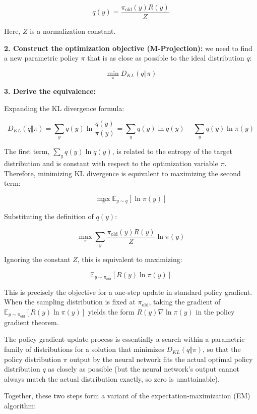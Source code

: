 \[
q(y)=\frac{\pi_{\mathrm{old}}(y)R(y)}{Z}
\]

Here, \(Z\) is a normalization constant.

\textbf{2. Construct the optimization objective (M-Projection):} we need to find a new parametric policy \(\pi\) that is as close as possible to the ideal distribution \(q\):

\[
\min_\pi D_{KL}(q\Vert \pi)
\]

\textbf{3. Derive the equivalence:}

Expanding the KL divergence formula:

\[
D_{KL}(q\Vert \pi)
= \sum_y q(y)\ln\frac{q(y)}{\pi(y)}
= \sum_y q(y)\ln q(y)-\sum_y q(y)\ln\pi(y)
\]

The first term, \(\sum_y q(y)\ln q(y)\), is related to the entropy of the target distribution and is constant with respect to the optimization variable \(\pi\). Therefore, minimizing KL divergence is equivalent to maximizing the second term:

\[
\max_\pi \mathbb{E}_{y\sim q}[\ln \pi(y)]
\]

Substituting the definition of \(q(y)\):

\[
\max_\pi \sum_y \frac{\pi_{\mathrm{old}}(y)R(y)}{Z}\ln\pi(y)
\]

Ignoring the constant \(Z\), this is equivalent to maximizing:

\[
\mathbb{E}_{y\sim \pi_{\mathrm{old}}}[R(y)\ln\pi(y)]
\]

This is precisely the objective for a one-step update in standard policy gradient. When the sampling distribution is fixed at \(\pi_{\mathrm{old}}\), taking the gradient of \(\mathbb{E}_{y\sim\pi_{\mathrm{old}}}[R(y)\ln\pi(y)]\) yields the form \(R(y)\nabla\ln\pi(y)\) in the policy gradient theorem.

The policy gradient update process is essentially a search within a parametric family of distributions for a solution that minimizes \(D_{KL}(q\Vert \pi)\), so that the policy distribution \(\pi\) output by the neural network fits the actual optimal policy distribution \(q\) as closely as possible (but the neural network's output cannot always match the actual distribution exactly, so zero is unattainable).

Together, these two steps form a variant of the expectation-maximization (EM) algorithm:

